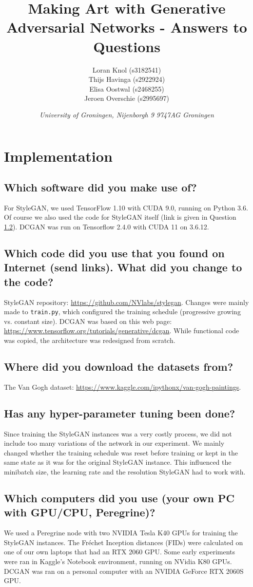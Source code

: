 \documentclass{article}
\title{\textbf{\huge Making Art with Generative Adversarial Networks - Answers to Questions}}
\author{Loran Knol (s3182541)\\Thijs Havinga (s2922924)\\Elisa Oostwal (s2468255)\\Jeroen Overschie (s2995697)}
\date{\textit{University of Groningen, Nijenborgh 9 9747AG Groningen}}
\begin{document}
\ttl
\thispagestyle{empty}

\section{Implementation}

\subsection{Which software did you make use of?}
For StyleGAN, we used TensorFlow 1.10 with CUDA 9.0, running on Python 3.6. Of course we also used the code for StyleGAN itself (link is given in Question \ref{_sec:internet_code}). DCGAN was run on Tensorflow 2.4.0 with CUDA 11 on 3.6.12.

\subsection{Which code did you use that you found on Internet (send links). What did you change to the code?}\label{_sec:internet_code}
StyleGAN repository: \url{https://github.com/NVlabs/stylegan}. Changes were mainly made to \verb|train.py|, which configured the training schedule (progressive growing vs. constant size). DCGAN was based on this web page: \url{https://www.tensorflow.org/tutorials/generative/dcgan}. While functional code was copied, the architecture was redesigned from scratch.

\subsection{Where did you download the datasets from?}
The Van Gogh dataset: \url{https://www.kaggle.com/ipythonx/van-gogh-paintings}.

\subsection{Has any hyper-parameter tuning been done?}
Since training the StyleGAN instances was a very costly process, we did not include too many variations of the network in our experiment. We mainly changed whether the training schedule was reset before training or kept in the same state as it was for the original StyleGAN instance. This influenced the minibatch size, the learning rate and the resolution StyleGAN had to work with.

\subsection{Which computers did you use (your own PC with GPU/CPU, Peregrine)?}
We used a Peregrine node with two NVIDIA Tesla K40 GPUs for training the StyleGAN instances. The Fréchet Inception distances (FIDs) were calculated on one of our own laptops that had an RTX 2060 GPU. Some early experiments were ran in Kaggle's Notebook environment, running on NVidia K80 GPUs. DCGAN was ran on a personal computer with an NVIDIA GeForce RTX 2060S GPU.
\end{document}
